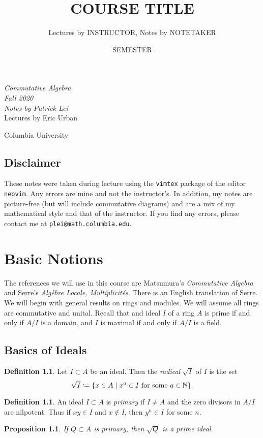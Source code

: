 \documentclass[leqno, openany]{memoir}
\title{COURSE TITLE}
\author{Lectures by INSTRUCTOR, Notes by NOTETAKER}
\date{SEMESTER}
\newtheorem{prop}[thm]{Proposition}
\theoremstyle{definition}
\newtheorem{defn}[thm]{Definition}
\theoremstyle{remark}
\theoremstyle{plain}
\theoremstyle{definition}
\theoremstyle{remark}
\newcommand{\N}{\mathbb{N}}
\newcommand*{\titleSW}
    {\begingroup%
    \raggedleft
    \vspace*{\baselineskip}
    {\Huge\itshape Commutative Algebra \\ Fall 2020}\\[\baselineskip]
    {\large\itshape Notes by Patrick Lei}\\[0.2\textheight]
    {\Large Lectures by Eric Urban}\par
    \vfill
    {\Large \sffamily Columbia University}
    \vspace*{\baselineskip}
\endgroup}
\begin{document}
    
\begin{titlingpage}
\titleSW
\end{titlingpage}

\thispagestyle{empty}
\section*{Disclaimer}%
\label{sec:disclaimer}

These notes were taken during lecture using the \texttt{vimtex} package of the editor \texttt{neovim}. 
Any errors are mine and not the instructor's. 
In addition, my notes are picture-free (but will include commutative diagrams) and are a mix of my mathematical style and that of the instructor.
If you find any errors, please contact me at \texttt{plei@math.columbia.edu}.
\newpage



\tableofcontents

\chapter{Basic Notions}%
\label{cha:basic_notions}

The references we will use in this course are Matsumura's \textit{Commutative Algebra} and Serre's \textit{Alg\`ebre Locale, Multiplicit\'es}. There is an English translation of Serre.
We will begin with general results on rings and modules. We will assume all rings are commutative and unital. Recall that and ideal $I$ of a ring $A$ is prime if and only if $A/I$ is a domain, and $I$ is maximal if and only if $A/I$ is a field.

\section{Basics of Ideals}%
\label{sec:basics_of_ideals}


\begin{defn}
    Let $I \subset A$ be an ideal. Then the \textit{radical} $\sqrt{I}$ of $I$ is the set 
    \[ \sqrt{I} \coloneqq \qty{x \in A \mid x^a \in I \text{ for some } a \in \N}. \]
\end{defn}

\begin{defn}
    An ideal $I \subset A$ is \textit{primary} if $I \neq A$ and the zero divisors in $A/I$ are nilpotent. Thus if $xy \in I$ and $x \notin I$, then $y^n \in I$ for some $n$.
\end{defn}

\begin{prop}
    \label{prop:radical_of_primary}
    If $Q \subset A$ is primary, then $\sqrt{Q}$ is a prime ideal.
\end{prop}
\end{document}

